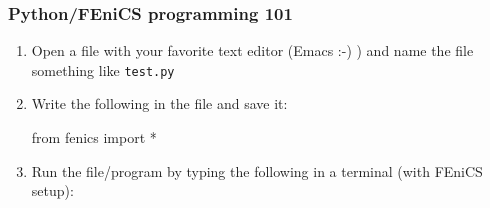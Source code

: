 \begin{frame}[fragile]
\frametitle{Python/FEniCS programming 101}

\begin{enumerate}
\item
  Open a file with your favorite text editor (Emacs :-) ) and name the
  file something like \texttt{test.py}
  \bigskip
\item
  Write the following in the file and save it:
\vspace{-1em}
  \begin{python}
from fenics import *

  \end{python}
  \bigskip
\item
  Run the file/program by typing the following in a terminal (with
  FEniCS setup):
\vspace{-1em}
\end{enumerate}

\end{frame}

